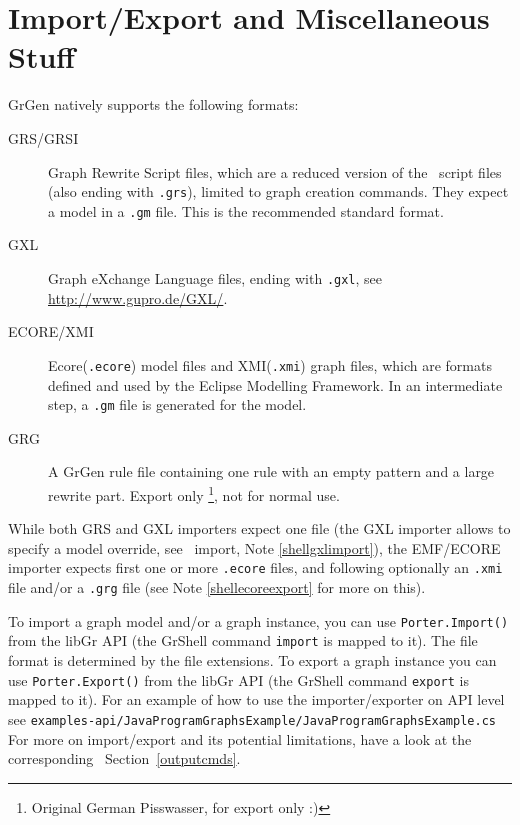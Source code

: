 \section{Import/Export and Miscellaneous Stuff}\label{sub:imexport}

GrGen natively supports the following formats:
\begin{description}
  \item[GRS/GRSI] Graph Rewrite Script files, which are a reduced version of the \GrShell\ script files (also ending with \texttt{.grs}), limited to graph creation commands. They expect a model in a \texttt{.gm} file. This is the recommended standard format.
  \item[GXL] Graph eXchange Language files, ending with \texttt{.gxl}, see \url{http://www.gupro.de/GXL/}.
  \item[ECORE/XMI] Ecore(\texttt{.ecore}) model files and XMI(\texttt{.xmi}) graph files, which are formats defined and used by the Eclipse Modelling Framework. In an intermediate step, a \texttt{.gm} file is generated for the model.
  \item[GRG] A GrGen rule file containing one rule with an empty pattern and a large rewrite part. Export only \footnote{Original German Pisswasser, for export only :)}, not for normal use.
\end{description}

While both GRS and GXL importers expect one file
(the GXL importer allows to specify a model override, see \GrShell\ import, Note \ref{shellgxlimport}),
the EMF/ECORE importer expects first one or more \texttt{.ecore} files,
and following optionally an \texttt{.xmi} file and/or a \texttt{.grg} file (see Note \ref{shellecoreexport} for more on this). 

To import a graph model and/or a graph instance, you can use \texttt{Porter.Import()} from the libGr API (the GrShell command \texttt{import} is mapped to it).
The file format is determined by the file extensions.
To export a graph instance you can use \texttt{Porter.Export()} from the libGr API (the GrShell command \texttt{export} is mapped to it).
For an example of how to use the importer/exporter on API level see \texttt{examples-api/Java\-Program\-Graphs\-Example/Java\-Program\-Graphs\-Example.cs}
For more on import/export and its potential limitations, have a look at the corresponding \GrShell\ Section~\ref{outputcmds}.

